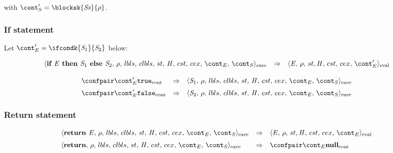 \documentclass{article}
\begin{document}
\noindent
with $\scont' = \blocksk{\stmts}{\env}$.

\subsubsection{If statement}

Let $\econt' = \ifcondk{\stmti{1}}{\stmti{2}}$ below:

\[
  \begin{array}{lcl}
	\execconf{\textbf{if } \expr \textbf{ then } \stmti{1} \textbf{ else } \stmti{2} }{\env}{\lbls}{\clbls}{\handler}{\cstrace}{\cex}{\econt}{\scont}
	& \Rightarrow &
	\evalconf{\expr}{\env}{\strace}{\cstrace}{\cex}{\econt'}\\[2mm]
  \end{array}
\]
\[
  \begin{array}{lcl}
	\contconf{\econt'}{\true} 
	& \Rightarrow &
	\execconf{\stmti{1}}{\env}{\lbls}{\clbls}{\handler}{\cstrace}{\cex}{\econt}{\scont}\\[2mm]

	\contconf{\econt'}{\false} 
	& \Rightarrow &
	\execconf{\stmti{2}}{\env}{\lbls}{\clbls}{\handler}{\cstrace}{\cex}{\econt}{\scont}\\
  \end{array}
\]

\subsubsection{Return statement}

\[
  \begin{array}{lcl}
	\execconf{\textbf{return } \expr}{\env}{\lbls}{\clbls}{\handler}{\cstrace}{\cex}{\econt}{\scont}
	& \Rightarrow &
	\evalconf{\expr}{\env}{\strace}{\cstrace}{\cex}{\econt}\\[2mm]
	
	\execconf{\textbf{return}}{\env}{\lbls}{\clbls}{\handler}{\cstrace}{\cex}{\econt}{\scont}
	& \Rightarrow &
	\contconf{\econt}{\textbf{null}}
  \end{array}
\]
\end{document}
